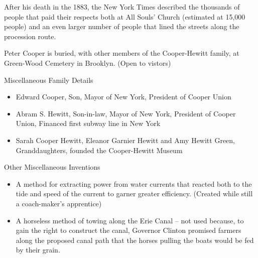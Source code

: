 \documentclass{article}
\begin{document}
\begin{minipage}[t]{0.46\linewidth}
\begin{enumList}
\item After his death in the 1883, the New York Times described the {\mdseries
thousands of people that paid their respects} both at All Souls' Church
(estimated at 15,000 people) and an even larger number of people that lined
the streets along the procession route.

\item Peter Cooper is buried, with other members of the Cooper-Hewitt family,
at {\mdseries Green-Wood Cemetery} in Brooklyn. (Open to vistors)

\setcounter{enumTemp}{\value{enumListi}}
\end{enumList}
\end{minipage}\hfill
\begin{minipage}[t]{0.46\linewidth}
\fontsize{11pt}{13pt}\selectfont
\raggedright
\upshape
\begin{enumList}
\setcounter{enumListi}{\value{enumTemp}}

\item Miscellaneous Family Details
\begin{itemize}[leftmargin=*]
\item Edward Cooper, Son, Mayor of New York, President of Cooper Union

\item Abram S. Hewitt, Son-in-law, Mayor of New York, President of Cooper Union,
Financed first subway line in New York

\item Sarah Cooper Hewitt, Eleanor Garnier Hewitt and Amy Hewitt Green,
Granddaughters, founded the Cooper-Hewitt Museum

\end{itemize}

\item Other Miscellaneous Inventions
\begin{itemize}[leftmargin=*]

\item A method for extracting power from water currents that reacted both to
the tide and speed of the current to garner greater efficiency. (Created while
still a coach-maker's apprentice)

\item A horseless method of towing along the Erie Canal -- not used because,
to gain the right to construct the canal, Governor Clinton promised farmers
along the proposed canal path that the horses pulling the boats would be fed
by their grain.


\end{itemize}
\end{enumList}
\end{minipage}
\end{document}
